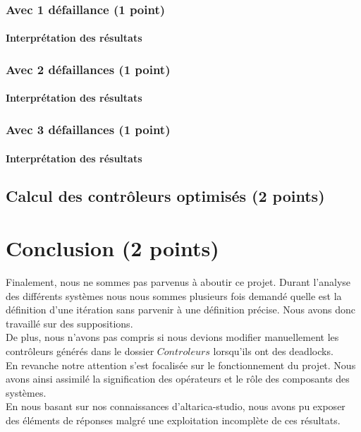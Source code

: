 \documentclass[a4paper]{book}
\begin{document}
\subsubsection{Avec 1 défaillance (1 point)}





\paragraph{Interprétation des résultats}


\subsubsection{Avec 2 défaillances (1 point)}





\paragraph{Interprétation des résultats}


\subsubsection{Avec 3 défaillances (1 point)}





\paragraph{Interprétation des résultats}

\subsection{Calcul des contrôleurs optimisés (2 points)}

\section{Conclusion (2 points)}

Finalement, nous ne sommes pas parvenus à aboutir ce projet. Durant l'analyse des différents systèmes nous nous sommes plusieurs fois demandé quelle est la définition d'une itération sans parvenir à une définition précise. Nous avons donc travaillé sur des suppositions.\\
De plus, nous n'avons pas compris si nous devions modifier manuellement les contrôleurs générés dans le dossier $Controleurs$ lorsqu'ils ont des deadlocks.\\
En revanche notre attention s'est focalisée sur le fonctionnement du projet. Nous avons ainsi assimilé la signification des opérateurs et le rôle des composants des systèmes. \\

En nous basant sur nos connaissances d'altarica-studio, nous avons pu exposer des éléments de réponses malgré une exploitation incomplète de ces résultats. \\
\end{document}
